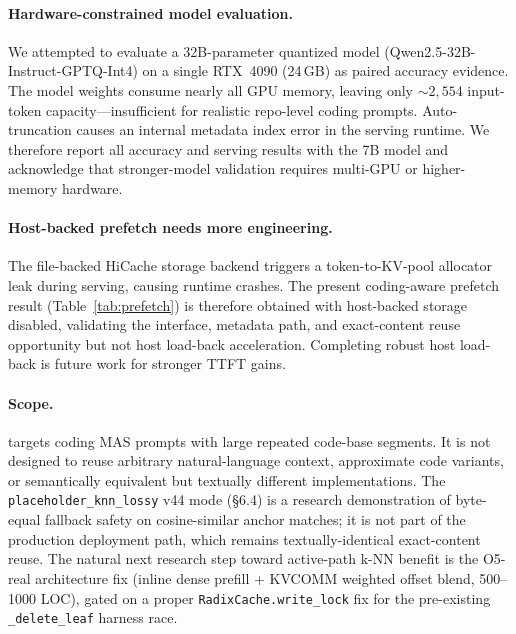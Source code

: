\paragraph{Hardware-constrained model evaluation.}
We attempted to evaluate a 32B-parameter quantized model (Qwen2.5-32B-Instruct-GPTQ-Int4) on a single RTX~4090 (24\,GB) as paired accuracy evidence.
The model weights consume nearly all GPU memory, leaving only ${\sim}2{,}554$ input-token capacity---insufficient for realistic repo-level coding prompts.
Auto-truncation causes an internal metadata index error in the serving runtime.
We therefore report all accuracy and serving results with the 7B model and acknowledge that stronger-model validation requires multi-GPU or higher-memory hardware.

\paragraph{Host-backed prefetch needs more engineering.}
The file-backed HiCache storage backend triggers a token-to-KV-pool allocator leak during serving, causing runtime crashes.
The present coding-aware prefetch result (Table~\ref{tab:prefetch}) is therefore obtained with host-backed storage disabled, validating the interface, metadata path, and exact-content reuse opportunity but not host load-back acceleration.
Completing robust host load-back is future work for stronger TTFT gains.

\paragraph{Scope.}
\system targets coding MAS prompts with large repeated code-base segments.
It is not designed to reuse arbitrary natural-language context, approximate code variants, or semantically equivalent but textually different implementations.
The \texttt{placeholder\_knn\_lossy} v44 mode (§6.4) is a research demonstration of byte-equal fallback safety on cosine-similar anchor matches; it is not part of the production deployment path, which remains textually-identical exact-content reuse.
The natural next research step toward active-path k-NN benefit is the O5-real architecture fix (inline dense prefill + KVCOMM weighted offset blend, 500--1000 LOC), gated on a proper \texttt{RadixCache.write\_lock} fix for the pre-existing \texttt{\_delete\_leaf} harness race.

